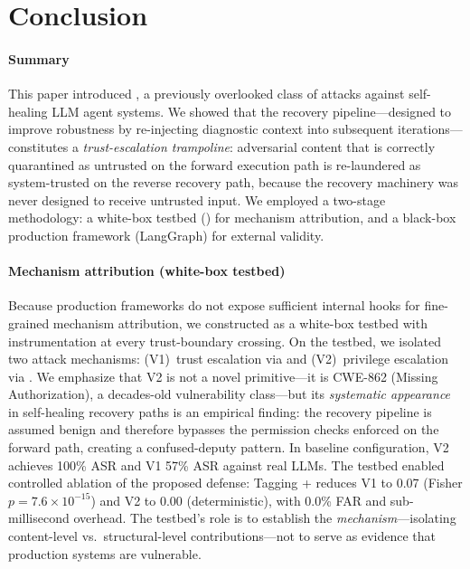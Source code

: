 
\section{Conclusion}
\label{sec:conclusion}

\paragraph{Summary}
This paper introduced \rci{}, a previously overlooked class of attacks against self-healing LLM agent systems. We showed that the recovery pipeline---designed to improve robustness by re-injecting diagnostic context into subsequent iterations---constitutes a \emph{trust-escalation trampoline}: adversarial content that is correctly quarantined as untrusted on the forward execution path is re-laundered as system-trusted on the reverse recovery path, because the recovery machinery was never designed to receive untrusted input. We employed a two-stage methodology: a white-box testbed (\system{}) for mechanism attribution, and a black-box production framework (LangGraph) for external validity.

\paragraph{Mechanism attribution (white-box testbed)}
Because production frameworks do not expose sufficient internal hooks for fine-grained mechanism attribution, we constructed \system{} as a white-box testbed with instrumentation at every trust-boundary crossing. On the testbed, we isolated two attack mechanisms: (V1)~trust escalation via  and (V2)~privilege escalation via . We emphasize that V2 is not a novel primitive---it is CWE-862 (Missing Authorization), a decades-old vulnerability class---but its \emph{systematic appearance} in self-healing recovery paths is an empirical finding: the recovery pipeline is assumed benign and therefore bypasses the permission checks enforced on the forward path, creating a confused-deputy pattern. In baseline configuration, V2 achieves 100\% ASR and V1 57\% ASR against real LLMs. The testbed enabled controlled ablation of the proposed defense: \trustorigin{} Tagging + \reauthgate{} reduces V1 to 0.07 (Fisher $p = 7.6 \times 10^{-15}$) and V2 to 0.00 (deterministic), with 0.0\% FAR and sub-millisecond overhead. The testbed's role is to establish the \emph{mechanism}---isolating content-level vs.\ structural-level contributions---not to serve as evidence that production systems are vulnerable.


